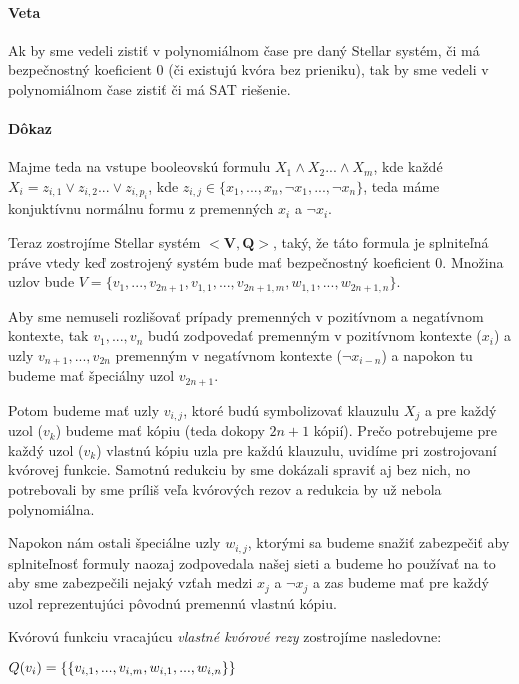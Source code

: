 \paragraph{Veta}
Ak by sme vedeli zistiť v polynomiálnom čase pre daný Stellar systém, či má bezpečnostný
koeficient 0 (či existujú kvóra bez prieniku), tak by sme vedeli
v polynomiálnom čase zistiť či má SAT riešenie.

\paragraph{Dôkaz}
Majme teda na vstupe booleovskú formulu $X_1 \land X_2 ... \land X_m$, kde každé\\
$X_i = z_{i,1} \lor z_{i,2} ... \lor z_{i,p_i}$, kde
$z_{i,j} \in \{x_1, ..., x_n, \neg x_1, ..., \neg x_n\}$, teda máme konjuktívnu
normálnu formu z premenných $x_i$ a $\neg x_i$.

Teraz zostrojíme Stellar systém $<\textbf{V},\textbf{Q}>$, taký, že táto formula
je splniteľná práve vtedy keď zostrojený systém bude mať bezpečnostný koeficient 0.
Množina uzlov bude
$V=\{v_1, ...,v_{2n+1}, v_{1,1}, ..., v_{2n+1,m}, w_{1,1}, ..., w_{2n+1,n}\}$.

Aby sme nemuseli rozlišovať prípady premenných v pozitívnom a negatívnom
kontexte, tak $v_1, ..., v_n$ budú zodpovedať premenným v pozitívnom kontexte
($x_i$) a uzly $v_{n+1}, ..., v_{2n}$ premenným v negatívnom kontexte
($\neg x_{i-n}$) a napokon tu budeme mať špeciálny uzol $v_{2n+1}$.

Potom budeme mať uzly $v_{i,j}$, ktoré budú symbolizovať klauzulu $X_j$
a pre každý uzol ($v_k$) budeme mať kópiu (teda dokopy $2n+1$ kópií). Prečo potrebujeme
pre každý uzol ($v_k$) vlastnú kópiu uzla pre každú klauzulu, uvidíme pri zostrojovaní
kvórovej funkcie.
Samotnú redukciu by sme dokázali spraviť aj bez nich, no potrebovali by sme
príliš veľa kvórových rezov a redukcia by už nebola polynomiálna.

Napokon nám ostali špeciálne uzly $w_{i,j}$, ktorými sa budeme snažiť zabezpečiť
aby splniteľnosť formuly naozaj zodpovedala našej sieti a budeme ho používať
na to aby sme zabezpečili nejaký vzťah medzi $x_j$ a $\neg x_j$ a zas budeme mať
pre každý uzol reprezentujúci pôvodnú premennú vlastnú kópiu.

Kvórovú funkciu vracajúcu \textit{vlastné kvórové rezy} zostrojíme nasledovne:

\vspace{5mm}
$\hfill Q(v_i)=\{\{v_{i,1}, ..., v_{i,m}, w_{i,1}, ..., w_{i,n}\}\}\hfill$

